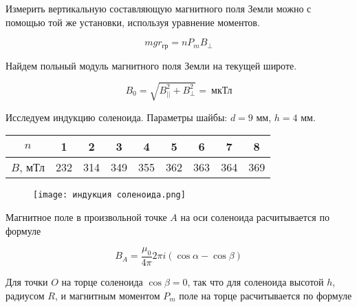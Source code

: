 
    \begin{center}
    \end{center}

    Измерить вертикальную составляющую магнитного поля Земли можно с помощью той же установки, используя уравнение моментов.

    \begin{equation*}
        m g r_{\text{гр}} = n P_m B_{\perp}
    \end{equation*}

    \begin{center}
    \end{center}

    Найдем польный модуль магнитного поля Земли на текущей широте.

    \begin{equation*}
        B_0 = \sqrt{B_{||}^2 + B_{\perp}^2} = ~ \text{мкТл}
    \end{equation*}

    Исследуем индукцию соленоида. Параметры шайбы: $d = 9$ мм, $h = 4$ мм.

    \begin{table}[h!]
        \begin{center}
            \begin{tabular}{|c|c|c|c|c|c|c|c|c|}
                \hline
                $n$      & 1   & 2   & 3   & 4   & 5   & 6   & 7   & 8   \\ \hline
                $B$, мТл & 232 & 314 & 349 & 355 & 362 & 363 & 364 & 369 \\ \hline
            \end{tabular}
        \end{center}
    \end{table}

    \begin{figure}[h!]
        \centering
        \texttt{[image: индукция соленоида.png]}
        \caption{}
    \end{figure}

    Магнитное поле в произвольной точке $A$ на оси соленоида расчитывается по формуле

    \begin{equation*}
        B_A = \frac{\mu_0}{4 \pi} 2 \pi i (\cos \alpha - \cos \beta)
    \end{equation*}

    Для точки $O$ на торце соленоида $\cos \beta = 0$, так что для соленоида высотой $h$, радиусом $R$, и магнитным моментом
    $P_m$ поле на торце расчитывается по формуле

